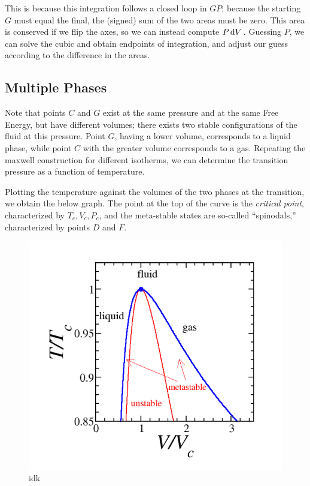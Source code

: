 This is because this integration follows a closed loop in \(GP\); because the starting \(G\)  must equal the final, the (signed) sum of the two areas must be zero. This area is conserved if we flip the axes, so we can instead compute \(P\d{V}\). Guessing \(P\), we can solve the cubic and obtain endpoints of integration, and adjust our guess according to the difference in the areas.

\subsection{Multiple Phases}
Note that points \(C\) and \(G\) exist at the same pressure and at the same Free Energy, but have different volumes; there exists two stable configurations of the fluid at this pressure. Point \(G\), having a lower volume, corresponds to a liquid phase, while point \(C\) with the greater volume corresponds to a gas. Repeating the maxwell construction for different isotherms, we can determine the transition pressure as a function of temperature.
	
Plotting the temperature against the volumes of the two phases at the transition, we obtain the below graph. The point at the top of the curve is the \emph{critical point}, characterized by \(T_c, V_c, P_c\), and the meta-stable states are so-called ``spinodals,'' characterized by points \(D\) and \(F\). 

\begin{figure}[!htbp]
	\begin{center}
		\includegraphics[scale=.4]{diagrams/phase/meta.png}
	\end{center}
	\caption{idk}\label{fig16:meta}
\end{figure}

